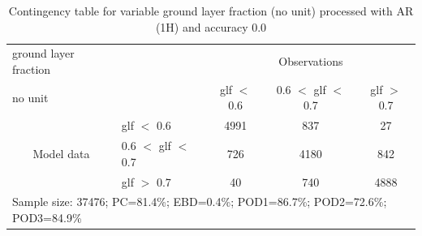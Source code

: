 \begin{table}[]
\begin{center}
\begin{tabular}{llccc}
\hline
{ground layer fraction}                                       &                                                    & \multicolumn{3}{c}{Observations}                 \\
{no unit}                                       &                             & glf $<$ 0.6   & 0.6 $<$ glf $<$ 0.7 & glf $>$ 0.7 \\
\hline
\multicolumn{1}{c}{\multirow{3}{*}{Model data}}  & glf $<$ 0.6             & 4991                & 837                       & 27              \\
                                                 & 0.6  $<$ glf $<$ 0.7 & 726                & 4180                       & 842              \\
                                                 & glf $>$ 0.7             & 40                & 740                       & 4888              \\
\hline
\multicolumn{5}{l}{Sample size: 37476; PC=81.4\%; EBD=0.4\%; POD1=86.7\%; POD2=72.6\%; POD3=84.9\%}
\end{tabular}
\end{center}
\caption{Contingency table for variable ground layer fraction (no unit) processed with AR (1H) and accuracy 0.0}
\label{tab:contingencyglfAFT}
\end{table}
